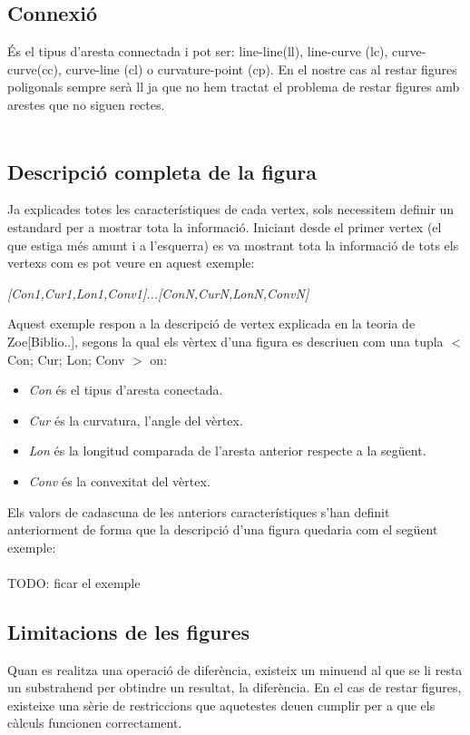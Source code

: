 \documentclass{article}
\begin{document}
\subsection{Connexió}
És el tipus d'aresta connectada i pot ser: line-line(ll), line-curve (lc), curve-curve(cc), curve-line (cl) o curvature-point (cp). En el nostre cas al restar figures poligonals sempre serà ll ja que no hem tractat el problema de restar figures amb arestes que no siguen rectes.
\\
\\
\subsection{Descripció completa de la figura}
Ja explicades totes les característiques de cada vertex, sols necessitem definir un estandard per a mostrar tota la informació.
Iniciant desde el primer vertex (el que estiga més amunt i a l'esquerra) es va mostrant tota la informació de tots els vertexs com es pot veure en aquest exemple:
  
\begin{center}
\emph{[Con1,Cur1,Lon1,Conv1]...[ConN,CurN,LonN,ConvN]}
\end{center}

Aquest exemple respon a la descripció de vertex explicada en la teoria de Zoe[Biblio..], segons la qual els vèrtex d'una figura es descriuen com una tupla $<$ Con; Cur; Lon; Conv $>$ on:

\begin{itemize}
\item \emph{Con} és el tipus d'aresta conectada.
\item \emph{Cur} és la curvatura, l'angle del vèrtex.
\item \emph{Lon} és la longitud comparada de l'aresta anterior respecte a la següent.
\item \emph{Conv} és la convexitat del vèrtex.
\end{itemize}

Els valors de cadascuna de les anteriors característiques s'han definit anteriorment de forma que la descripció d'una figura quedaria com el següent exemple:
\\
\\
TODO: ficar el exemple

\subsection{Limitacions de les figures}
Quan es realitza una operació de diferència, existeix un minuend al que se li resta un substrahend per obtindre un resultat, la diferència. En el cas de restar figures, existeixe una sèrie de restriccions que aquetestes deuen cumplir per a que els càlculs funcionen correctament.
\end{document}
